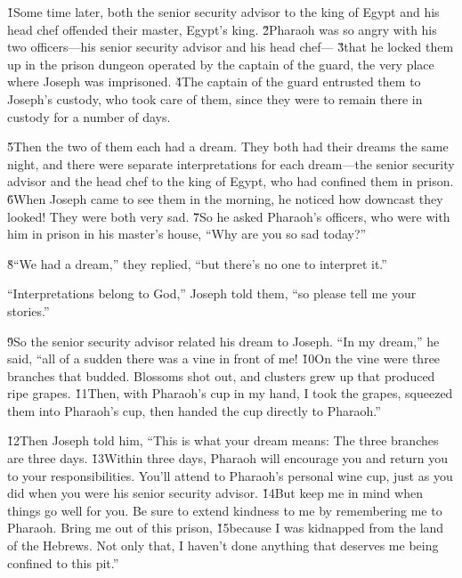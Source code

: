 \v{1}Some time later, both the senior security advisor to the king of Egypt and his head chef offended their master, Egypt's king. \v{2}Pharaoh was so angry with his two officers---his senior security advisor and his head chef--- \v{3}that he locked them up in the prison dungeon operated by the captain of the guard, the very place where Joseph was imprisoned. \v{4}The captain of the guard entrusted them to Joseph's custody, who took care of them, since they were to remain there in custody for a number of days.

\v{5}Then the two of them each had a dream. They both had their dreams the same night, and there were separate interpretations for each dream---the senior security advisor and the head chef to the king of Egypt, who had confined them in prison. \v{6}When Joseph came to see them in the morning, he noticed how downcast they looked! They were both very sad. \v{7}So he asked Pharaoh's officers, who were with him in prison in his master's house, ``Why are you so sad today?''

\v{8}``We had a dream,'' they replied, ``but there's no one to interpret it.''

``Interpretations belong to God,'' Joseph told them, ``so please tell me your stories.''

\v{9}So the senior security advisor related his dream to Joseph. ``In my dream,'' he said, ``all of a sudden there was a vine in front of me! \v{10}On the vine were three branches that budded. Blossoms shot out, and clusters grew up that produced ripe grapes. \v{11}Then, with Pharaoh's cup in my hand, I took the grapes, squeezed them into Pharaoh's cup, then handed the cup directly to Pharaoh.''

\v{12}Then Joseph told him, ``This is what your dream means: The three branches are three days. \v{13}Within three days, Pharaoh will encourage you and return you to your responsibilities. You'll attend to Pharaoh's personal wine cup, just as you did when you were his senior security advisor. \v{14}But keep me in mind when things go well for you. Be sure to extend kindness to me by remembering me to Pharaoh. Bring me out of this prison, \v{15}because I was kidnapped from the land of the Hebrews. Not only that, I haven't done anything that deserves me being confined to this pit.''

